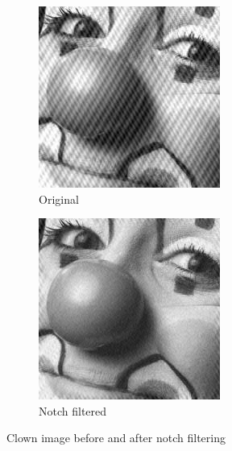 \documentclass[]{article}
\begin{document}
\begin{figure}[H]
     \centering
     \begin{subfigure}[b]{0.45\textwidth}
         \centering
         \includegraphics[width=\textwidth]{clown}
         \caption{Original}
         \label{fig:clown_orig}
     \end{subfigure}
     \hfill
     \begin{subfigure}[b]{0.45\textwidth}
         \centering
         \includegraphics[width=\textwidth]{clown_filtered}
         \caption{Notch filtered}
         \label{fig:clown_filtered}
     \end{subfigure}
    \caption{Clown image before and after notch filtering}
    \label{fig:clown_before_after}
\end{figure}
\end{document}
